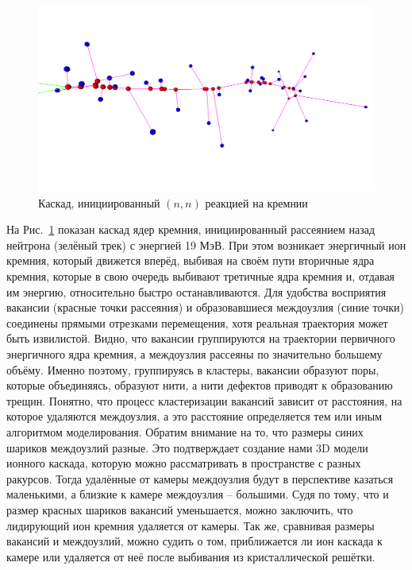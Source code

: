 \documentclass[a4paper,12pt]{article}
\begin{document}
\begin{large}
 \begin{figure}[ht]
  \centering
  \includegraphics[width=0.99\linewidth]{images/6338_0}
  \caption{Каскад, инициированный $(n,n)$ реакцией на кремнии}
  \label{fig:SiAlpha19MeV}
 \end{figure}

 На Рис.~\ref{fig:SiAlpha19MeV} показан каскад ядер кремния, инициированный рассеянием назад нейтрона (зелёный трек) с энергией 19 МэВ.
 При этом возникает энергичный ион кремния, который движется вперёд, выбивая на своём пути вторичные ядра кремния, которые в свою очередь выбивают третичные ядра кремния и, отдавая им энергию, относительно быстро останавливаются.
 Для удобства восприятия вакансии (красные точки рассеяния) и образовавшиеся междоузлия (синие точки) соединены прямыми отрезками перемещения, хотя реальная траектория может быть извилистой.
 Видно, что вакансии группируются на траектории первичного энергичного ядра кремния, а междоузлия рассеяны по значительно большему объёму.
 Именно поэтому, группируясь в кластеры, вакансии образуют поры, которые объединяясь, образуют нити, а нити дефектов приводят к образованию трещин.
 Понятно, что процесс кластеризации вакансий зависит от расстояния, на которое удаляются междоузлия, а это расстояние определяется тем или иным алгоритмом моделирования.
 Обратим внимание на то, что размеры синих шариков междоузлий разные.
 Это подтверждает создание нами 3D модели ионного каскада, которую можно рассматривать в пространстве с разных ракурсов.
 Тогда удалённые от камеры междоузлия будут в перспективе казаться маленькими, а близкие к камере междоузлия -- большими.
 Судя по тому, что и размер красных шариков вакансий уменьшается, можно заключить, что лидирующий ион кремния удаляется от камеры.
 Так же, сравнивая размеры вакансий и междоузлий, можно судить о том, приближается ли ион каскада к камере или удаляется от неё после выбивания из кристаллической решётки.
 

\end{large}
\end{document}
